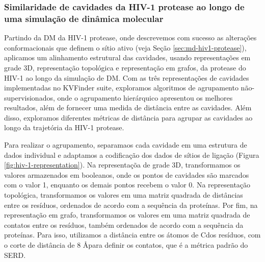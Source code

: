 \documentclass[Portugues]{phdquali}
\begin{document}
\subsubsection{Similaridade de cavidades da HIV-1 protease ao longo de uma simulação de dinâmica molecular}

Partindo da DM da HIV-1 protease, onde descrevemos com sucesso as alterações conformacionais que definem o sítio ativo (veja Seção \ref{sec:md-hiv1-protease}), aplicamos um alinhamento estrutural das cavidades, usando representações em grade 3D, representação topológica e representação em grafos, da protease do HIV-1 ao longo da simulação de DM. Com as três representações de cavidades implementadas no KVFinder suite, exploramos algoritmos de agrupamento não-supervisionados, onde o agrupamento hierárquico apresentou os melhores resultados, além de fornecer uma medida de distância entre as cavidades. Além disso, exploramos diferentes métricas de distância para agrupar as cavidades ao longo da trajetória da HIV-1 protease.

Para realizar o agrupamento, separamaos cada cavidade em uma estrutura de dados individual e adaptamos a codificação dos dados de sítios de ligação (Figura \ref{fig:hiv-1-representation}). Na representaçõa de grade 3D, transformamos os valores armazenados em booleanos, onde os pontos de cavidades são marcados com o valor 1, enquanto os demais pontos recebem o valor 0. Na representação topológica, transformamos os valores em uma matriz quadrada de distâncias entre os resíduos, ordenados de acordo com a sequência da proteínas. Por fim, na representação em grafo, transformamos os valores em uma matriz quadrada de contatos entre os resíduos, também ordenados de acordo com a sequência da proteínas. Para isso, utilizamos a distância entre os átomos de C\textbeta\space dos resíduos, com o corte de distância de 8 \AA para definir os contatos, que é a métrica padrão do SERD.
\end{document}
